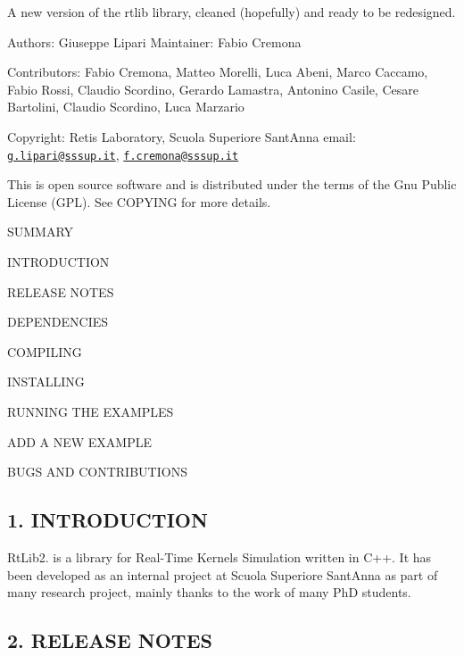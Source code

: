 A new version of the rtlib library, cleaned (hopefully) and ready to be redesigned.

Authors\+: Giuseppe Lipari Maintainer\+: Fabio Cremona

Contributors\+: Fabio Cremona, Matteo Morelli, Luca Abeni, Marco Caccamo, Fabio Rossi, Claudio Scordino, Gerardo Lamastra, Antonino Casile, Cesare Bartolini, Claudio Scordino, Luca Marzario

Copyright\+: Retis Laboratory, Scuola Superiore Sant\textquotesingle{}Anna email\+: \href{mailto:g.lipari@sssup.it}{\tt g.\+lipari@sssup.\+it}, \href{mailto:f.cremona@sssup.it}{\tt f.\+cremona@sssup.\+it}

This is open source software and is distributed under the terms of the Gnu Public License (G\+PL). See C\+O\+P\+Y\+I\+NG for more details. 



S\+U\+M\+M\+A\+RY


\begin{DoxyEnumerate}
\item I\+N\+T\+R\+O\+D\+U\+C\+T\+I\+ON
\item R\+E\+L\+E\+A\+SE N\+O\+T\+ES
\item D\+E\+P\+E\+N\+D\+E\+N\+C\+I\+ES
\item C\+O\+M\+P\+I\+L\+I\+NG
\item I\+N\+S\+T\+A\+L\+L\+I\+NG
\item R\+U\+N\+N\+I\+NG T\+HE E\+X\+A\+M\+P\+L\+ES
\item A\+DD A N\+EW E\+X\+A\+M\+P\+LE
\item B\+U\+GS A\+ND C\+O\+N\+T\+R\+I\+B\+U\+T\+I\+O\+NS 


\end{DoxyEnumerate}

\subsection*{1. I\+N\+T\+R\+O\+D\+U\+C\+T\+I\+ON}

Rt\+Lib2. is a library for Real-\/\+Time Kernels Simulation written in C++. It has been developed as an internal project at Scuola Superiore Sant\textquotesingle{}Anna as part of many research project, mainly thanks to the work of many PhD students.

\subsection*{2. R\+E\+L\+E\+A\+SE N\+O\+T\+ES}

